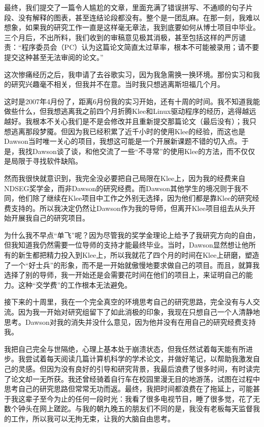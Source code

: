 \documentclass[letter,12pt]{book}
\begin{document}
\begin{CJK}{UTF8}{gbsn}
最终，我们提交了一篇令人尴尬的文章，里面充满了错误拼写、不通顺的句子片段、没有解释的图表，甚至连结论段都没有。整个是一团乱麻。在那一刻，我难以想象，如果我的研究工作一直是这样毫无章法，我到底要如何从博士项目中毕业。三个月后，不出所料，我们收到的审稿意见极其消极，甚至包括这样的严厉谴责：“程序委员会（PC）认为这篇论文简直太过草率，根本不可能被录用；请不要提交这种甚至无法审阅的论文。”

\breakline

这次惨痛经历之后，我申请了去谷歌实习，因为我急需换一换环境。那份实习和我的研究兴趣毫不相关，但我并不在意。当时我只想逃离斯坦福几个月。

这时是2007年4月份了，距离6月份我的实习开始，还有十周的时间。我不知道我能做些什么，但我想逃离我之前四个月折腾Klee和Linux驱动程序的经历，逃得越远越好。我根本不关心我们是不是会修改并且重新提交那篇论文（最后没有）；我只想逃离那段梦魇。但因为我已经积累了近千小时的使用Klee的经验，而这也是Dawson当时唯一关心的项目，我想这可能是一个开展新课题不错的切入点。于是，我找Dawson谈了谈，和他交流了一些“不寻常”的使用Klee的方法，而不仅仅是局限于寻找软件缺陷。

然而我很快就意识到，我完全没必要把自己局限在Klee上，因为我的经费来自NDSEG奖学金，而非Dawson的研究经费。而Dawson其他学生的境况则于我不同，他们除了继续在Klee项目中工作之外别无选择，因为他们都是靠Klee的研究经费支持的。所以我决定仍然让Dawson作为我的导师，但离开Klee项目组去从头开始开展我自己的研究项目。

为什么我不早点“单飞”呢？因为尽管我的奖学金理论上给予了我研究方向的自由，但我知道我仍然需要一位导师的支持才能最终毕业。当时，Dawson显然想让他所有的新生都把精力投入到Klee上，所以我就花了四个月的时间在Klee上研磨，塑造了一个“好士兵”的形象，而不是一开始就傲慢地要求做自己的项目。而且，就算我选择了别的导师，我一开始还是会需要花时间在他们的项目上，来证明自己的能力。这种“交学费”的工作根本无法避免。

接下来的十周里，我在一个完全真空的环境思考自己的研究思路，完全没有与人交流。因为我一开始对研究组留下了如此消极的印象，我现在只想自己一个人清静地思考。Dawson对我的消失并没什么意见，因为他并没有在用自己的研究经费支持我。

我把自己完全与世隔绝，心理上基本处于崩溃状态，但我任然试着每天能有所进步。我尝试着每天阅读几篇计算机科学的学术论文，并做好笔记，以帮助我激发自己的灵感。但因为没有良好的引导和研究背景，我最后浪费了很多时间，有时读完了论文却一无所获。我还曾经骑着自行车在校园里漫无目的地游荡，试图在过程中思考自己的研究思路但常常无功而返。最终，我把时间都浪费在了拖延上，可能甚于我这辈子至今为止的任何一段时光：我看了很多电视节目，睡了很多觉，花了无数个钟头在网上蹉跎。与我的朝九晚五的朋友们不同的是，我没有老板每天监督我的工作，所以我可以无拘无束，让我的大脑自由思考。


\end{CJK}
\end{document}
